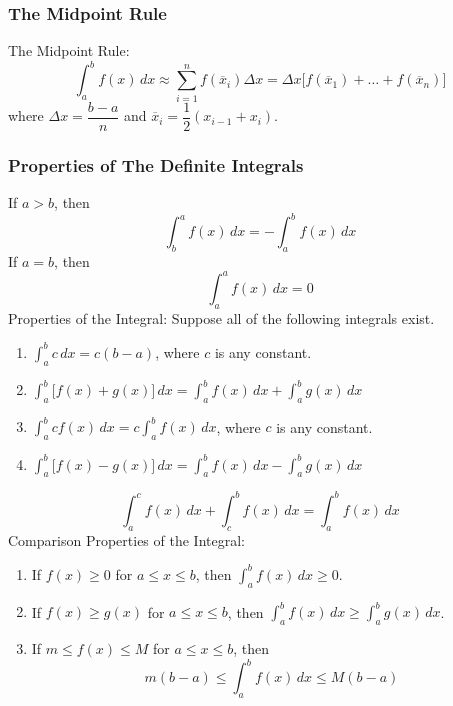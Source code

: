 \subsubsection*{The Midpoint Rule}
The Midpoint Rule:
\[\int_a^b f(x)\,dx\approx \sum_{i=1}^n f(\overline{x}_i)\Delta x
=\Delta x\big[f(\overline{x}_1)+\dots+f(\overline{x}_n)\big]\]
where \(\Delta x=\dfrac{b-a}{n}\) and
\(\overline{x}_i=\dfrac{1}{2}(x_{i-1}+x_i)\).

\subsubsection*{Properties of The Definite Integrals}
If \(a>b\), then
\[\int_b^a f(x)\,dx=-\int_a^b f(x)\,dx\]
If \(a=b\), then
\[\int_a^a f(x)\,dx=0\]
Properties of the Integral: Suppose all of the following integrals exist.
\begin{enumerate}
    \item \(\displaystyle{\int_a^b c\,dx=c(b-a)}\), where \(c\) is any
    constant.
    \item \(\displaystyle{\int_a^b\big[f(x)+g(x)\big]\,dx
    =\int_a^b f(x)\,dx+\int_a^b g(x)\,dx}\)
    \item \(\displaystyle{\int_a^b cf(x)\,dx=c\int_a^b f(x)\,dx}\), where
    \(c\) is any constant.
    \item \(\displaystyle{\int_a^b\big[f(x)-g(x)\big]\,dx
    =\int_a^b f(x)\,dx-\int_a^b g(x)\,dx}\)
\end{enumerate}
\[\int_a^c f(x)\,dx+\int_c^b f(x)\,dx=\int_a^b f(x)\,dx\]
Comparison Properties of the Integral:
\begin{enumerate}
    \item If \(f(x)\geq 0\) for \(a\leq x\leq b\),
    then \(\displaystyle{\int_a^b f(x)\,dx\geq 0}\).
    \item If \(f(x)\geq g(x)\) for \(a\leq x\leq b\),
    then \(\displaystyle{\int_a^b f(x)\,dx\geq \int_a^b g(x)\,dx}\).
    \item If \(m\leq f(x)\leq M\) for \(a\leq x\leq b\),
    then
    \[m(b-a)\leq\int_a^b f(x)\,dx\leq M(b-a)\]
\end{enumerate}